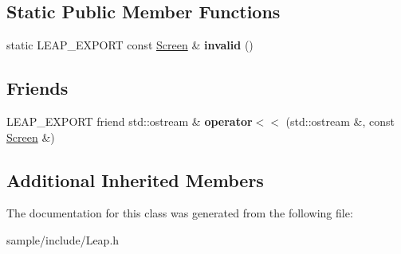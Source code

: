 \subsection*{Static Public Member Functions}
\begin{DoxyCompactItemize}
\item 
\mbox{\label{class_leap_1_1_screen_a380e39a87c63fd4915f1f5e5c5db0c3c}} 
static L\+E\+A\+P\+\_\+\+E\+X\+P\+O\+RT const \hyperlink{class_leap_1_1_screen}{Screen} \& {\bfseries invalid} ()
\end{DoxyCompactItemize}
\subsection*{Friends}
\begin{DoxyCompactItemize}
\item 
\mbox{\label{class_leap_1_1_screen_a9d392849d557b2c5107a836a227d63a6}} 
L\+E\+A\+P\+\_\+\+E\+X\+P\+O\+RT friend std\+::ostream \& {\bfseries operator$<$$<$} (std\+::ostream \&, const \hyperlink{class_leap_1_1_screen}{Screen} \&)
\end{DoxyCompactItemize}
\subsection*{Additional Inherited Members}


The documentation for this class was generated from the following file\+:\begin{DoxyCompactItemize}
\item 
sample/include/Leap.\+h\end{DoxyCompactItemize}
